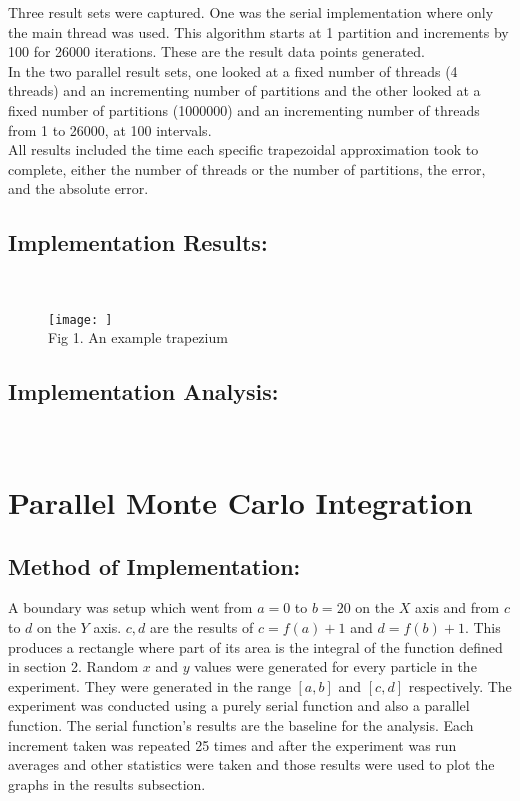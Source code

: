 \documentclass[11pt]{article}
\begin{document}
\begin{page}
\noindent Three result sets were captured. One was the serial implementation where only the main thread was used. This algorithm starts at 1 partition and increments by 100 for 26000 iterations. These are the result data points generated.\\

\noindent In the two parallel result sets, one looked at a fixed number of threads (4 threads) and an incrementing number of partitions and the other looked at a fixed number of partitions (1000000) and an incrementing number of threads from 1 to 26000, at 100 intervals.\\

\noindent All results included the time each specific trapezoidal approximation took to complete, either the number of threads or the number of partitions, the error, and the absolute error.

\subsection{Implementation Results:}\\
\begin{figure}[ht]
\centering
     \texttt{[image: ]}\\
     Fig 1. An example trapezium
\end{figure}

\subsection{Implementation Analysis:}\\

\section{Parallel Monte Carlo Integration}
\subsection{Method of Implementation:}
\noindent A boundary was setup which went from $a = 0$ to $b = 20$ on the $X$ axis and from $c$ to $d$ on the $Y$ axis. $c,d$ are the results of $c = f(a) + 1$ and $d = f(b) + 1$. This produces a rectangle where part of its area is the integral of the function defined in section 2. Random $x$ and $y$ values were generated for every particle in the experiment. They were generated in the range $[a,b]$ and $[c,d]$ respectively. The experiment was conducted using a purely serial function and also a parallel function. The serial function's results are the baseline for the analysis. Each increment taken was repeated 25 times and after the experiment was run averages and other statistics were taken and those results were used to plot the graphs in the results subsection.\\


\end{page}
\end{document}
